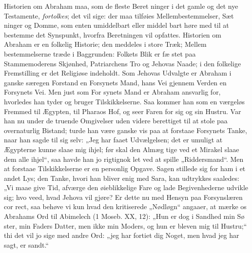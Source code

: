 \documentclass[12pt]{book}
\newcommand{\opage}[1]{\marginnote{\footnotesize\textit{[#1]}}}
\begin{document}
Historien om Abraham maa, som de fleste Beret\-%
ninger i det gamle og det nye Testamente, \emph{fortolkes};
det vil sige: der maa tilføies Mellembestemmelser, Sæt\-%
ninger og Domme, som enten umiddelbart eller middel\-%
bart høre med til at bestemme det Synspunkt, hvorfra
Beretningen vil opfattes. Historien om Abraham er en
folkelig Historie; den meddeles i store Træk; Mellem\-%
bestemmelserne træde i Baggrunden: Folkets Blik er fæ\-%
stet paa Stammemoderens Skjønhed, Patriarchens Tro
og Jehovas Naade; i den folkelige Fremstilling er det
Religiøse indeholdt. Som Jehovas Udvalgte er Abraham
i ganske særegen Forstand en Forsynets Mand, hans Vei
gjennem Verden en Forsynets Vei. Men just som For\-%
synets Mand er Abraham ansvarlig for, hvorledes
han tyder og bruger Tilskikkelserne. Saa kommer
han som en værgeløs Fremmed til Ægypten, til Pharaos
Hof, og seer Faren for sig og sin Hustru. Var han nu
\opage{217}\setcounter{footnote}{0}%
under de truende Omgivelser uden videre berettiget til
at stole paa overnaturlig Bistand; turde han være ganske
vis paa at forstaae Forsynets Tanke, naar han sagde til
sig selv: „Jeg har faaet Udvælgelsen; det er umuligt at
Ægypterne kunne slaae mig ihjel; før skal den Almæg\-%
tige ved et Mirakel slaae dem alle ihjel“, saa havde han
jo rigtignok let ved at spille „Riddersmand“. Men at
forstaae Tilskikkelserne er en personlig Opgave. Sagen
stillede sig for ham i et andet Lys; den Tanke, hvori
han bliver enig med Sara, kan udtrykkes saaledes: „Vi
maae give Tid, afværge den øieblikkelige Fare og lade
Begivenhederne udvikle sig; hvo veed, hvad Jehova vil
gjøre? Er dette nu med Hensyn paa Forsynslæren cor\-%
rect, saa behøve vi kun hvad den kritiserede „Nødløgn“
angaaer, at mærke os Abrahams Ord til Abimelech
(1 Moseb. XX, 12): „Hun er dog i Sandhed min Sø\-%
ster, min Faders Datter, men ikke min Moders, og hun
er bleven mig til Hustru;“ thi det vil jo sige med andre
Ord: „jeg har fortiet dig Noget, men hvad jeg har sagt,
er sandt.“
\end{document}
